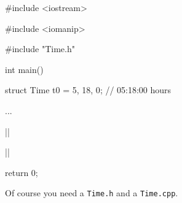 \begin{consolethree}[escapeinside=||]

#include <iostream>

#include <iomanip>

#include "Time.h"



int main()

{

  struct Time t0 = {5, 18, 0}; // 05:18:00 hours



  ...



  ||

  ||



  return 0;

}

\end{consolethree}



Of course you need a \texttt{Time.h} and a \texttt{Time.cpp}.

